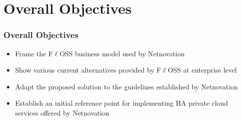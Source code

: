 \section{Overall Objectives}

\begin{frame}%
\frametitle{Overall Objectives}

\begin{itemize}
  \item Frame the F$\ell$OSS business model used by Netnovation
  
  \vspace{0.2cm}
  
  \item Show various current alternatives provided by F$\ell$OSS at enterprise level
  
  \vspace{0.2cm}
  
  \item Adapt the proposed solution to the guidelines established by Netnovation
  
  \vspace{0.2cm}
  
  \item Establish an initial reference point for implementing HA private cloud services offered by Netnovation
\end{itemize}

\end{frame}